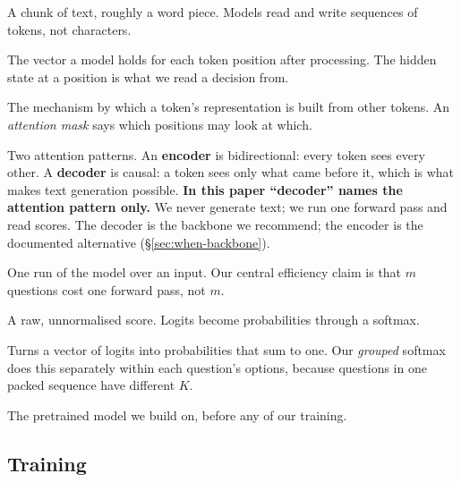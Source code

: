 \begin{description}[leftmargin=0em,style=nextline,itemsep=0.3em]

\item[Token] A chunk of text, roughly a word piece. Models read and write
sequences of tokens, not characters.

\item[Embedding, hidden state] The vector a model holds for each token
position after processing. The hidden state at a position is what we read
a decision from.

\item[Attention] The mechanism by which a token's representation is built
from other tokens. An \emph{attention mask} says which positions may look
at which.

\item[Encoder vs decoder] Two attention patterns. An \textbf{encoder} is
bidirectional: every token sees every other. A \textbf{decoder} is causal:
a token sees only what came before it, which is what makes text generation
possible. \textbf{In this paper ``decoder'' names the attention pattern
only.} We never generate text; we run one forward pass and read scores.
The decoder is the backbone we recommend; the encoder is the documented
alternative (\S\ref{sec:when-backbone}).

\item[Forward pass] One run of the model over an input. Our central
efficiency claim is that $m$ questions cost one forward pass, not $m$.

\item[Logit] A raw, unnormalised score. Logits become probabilities
through a softmax.

\item[Softmax] Turns a vector of logits into probabilities that sum to
one. Our \emph{grouped} softmax does this separately within each
question's options, because questions in one packed sequence have
different $K$.

\item[Backbone] The pretrained model we build on, before any of our
training.

\end{description}

\subsection{Training}

